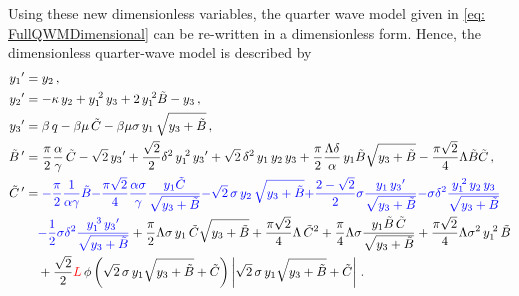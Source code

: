 \newpage
Using these new dimensionless variables, the quarter wave model given in \cref{eq: FullQWMDimensional} can be re-written in a dimensionless form. Hence, the dimensionless quarter-wave model is described by
~
\begin{equation} \label{eq: FullQWMDimensionless}
\begin{split}
    \dash{y_1} &= y_2 \, , \\
    \dash{y_2} &= - \kappa \, y_2 + y_1\power{2} \, y_3 + 2 \, y_1\power{2} \tilde{B} - y_3 \, , \\
    \dash{y_3} &= \beta \, q - \beta \mu \, \tilde{C} - \beta \mu \sigma \, y_1 \, \sqrt{y_3 + \tilde{B}} \, , \\
    \dash{\tilde{B}\,} &= \frac{\pi}{2} \frac{\alpha}{\gamma} \, \tilde{C} - \sqrt{2} \, \dash{y_3} + \frac{\sqrt{2}}{2} \delta^2 \, y_1\power{2} \, \dash{y_3} + \sqrt{2} \, \delta^2 \, y_1 \, y_2 \, y_3 + \frac{\pi}{2} \frac{\Lambda \delta}{\alpha} \, y_1 \tilde{B} \sqrt{y_3 + \tilde{B}} - \frac{\pi \sqrt{2}}{4} \Lambda \tilde{B} \tilde{C} \, , \\
    \dash{\tilde{C}\,} &=
    \textcolor{Blue}{- \frac{\pi}{2} \frac{1}{\alpha \gamma} \tilde{B}}
    \textcolor{Blue}{- \frac{\pi \sqrt{2}}{4} \frac{\alpha \sigma}{\gamma} \frac{y_1 \tilde{C}}{\sqrt{y_3 + \tilde{B}}} }
    \textcolor{Blue}{- \sqrt{2} \, \sigma \, y_2 \, \sqrt{y_3 + \tilde{B}} }
    \textcolor{Blue}{+ \frac{2-\sqrt{2}}{2} \sigma \frac{y_1 \, \dash{y_3}}{\sqrt{y_3 + \tilde{B}}} }
    \textcolor{Blue}{- \sigma \delta^2 \frac{y_1\power{2} \, y_2 \, y_3}{\sqrt{y_3 + \tilde{B}}} }
    \\ & \quad %
    \textcolor{Blue}{- \frac{1}{2} \sigma \delta^2 \frac{y_1\power{3} \, \dash{y_3}}{\sqrt{y_3 + \tilde{B}}} }
    + \frac{\pi}{2} \Lambda \sigma \, y_1 \, \tilde{C} \sqrt{y_3 + \tilde{B}}
    + \frac{\pi \sqrt{2}}{4} \Lambda \, \tilde{C}^2
    + \frac{\pi}{4} \Lambda \sigma \frac{y_1 \tilde{B} \, \tilde{C}}{\sqrt{y_3 + \tilde{B}}}
    + \frac{\pi \sqrt{2}}{4} \Lambda \sigma^2 \, y_1\power{2} \, \tilde{B}
    \\ & \quad %
    + \frac{\sqrt{2}}{2}
    \textcolor{Red}{L} \,
    \phi \left( \sqrt{2} \, \sigma \, y_1 \sqrt{y_3 + \tilde{B}} + \tilde{C} \right) \left| \sqrt{2} \, \sigma \, y_1 \sqrt{y_3 + \tilde{B}} + \tilde{C} \right| \, .
\end{split}
\end{equation}

